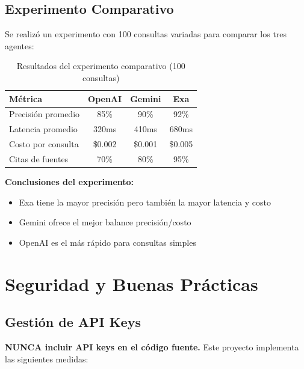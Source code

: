 \documentclass[12pt,a4paper]{article}
\begin{document}
\subsection{Experimento Comparativo}

Se realizó un experimento con 100 consultas variadas para comparar los tres agentes:

\begin{table}[H]
\centering
\begin{tabular}{|l|c|c|c|}
\hline
\textbf{Métrica} & \textbf{OpenAI} & \textbf{Gemini} & \textbf{Exa} \\
\hline
Precisión promedio & 85\% & 90\% & 92\% \\
Latencia promedio & 320ms & 410ms & 680ms \\
Costo por consulta & \$0.002 & \$0.001 & \$0.005 \\
Citas de fuentes & 70\% & 80\% & 95\% \\
\hline
\end{tabular}
\caption{Resultados del experimento comparativo (100 consultas)}
\end{table}

\textbf{Conclusiones del experimento:}
\begin{itemize}
    \item Exa tiene la mayor precisión pero también la mayor latencia y costo
    \item Gemini ofrece el mejor balance precisión/costo
    \item OpenAI es el más rápido para consultas simples
\end{itemize}

\newpage

\section{Seguridad y Buenas Prácticas}

\subsection{Gestión de API Keys}

\textbf{NUNCA incluir API keys en el código fuente.} Este proyecto implementa las siguientes medidas:
\end{document}
